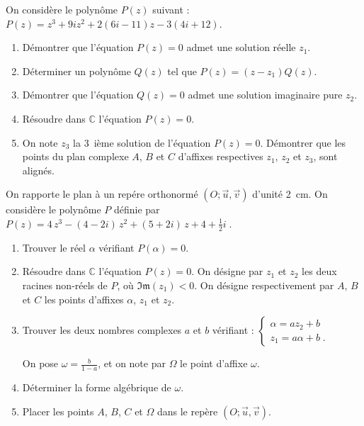 %
\begin{exo}
      On consid\`ere le polyn\^ome $P(z)$ suivant : $P(z) = z^3 + 9 i z^2 + 2(6i - 11)z - 3(4i + 12)$.
      \begin{enumerate}
            \item D\'emontrer que l'\'equation $P ( z ) = 0$ admet une solution r\'eelle $z_1$.
            \item D\'eterminer un polyn\^ome $Q ( z )$ tel que $P ( z ) = ( z - z_1 ) Q ( z )$.
            \item D\'emontrer que l'\'equation $Q ( z ) = 0$ admet une solution imaginaire pure $z_2$.
            \item R\'esoudre dans $\mathbb{C}$ l'\'equation $P ( z ) = 0$.
            \item On note $z_3$ la 3~i\`eme solution de l'\'equation $P ( z ) = 0$. 
                  D\'emontrer que les points du plan complexe $A$, $B$ et $C$ d'affixes respectives $z_1$, $z_2$ et $z_3$, 
                  sont align\'es.
      \end{enumerate}
\end{exo}
\begin{exo}
      On rapporte le plan \`a un rep\'ere orthonorm\'e $(O ; \vec{u} , \vec{v})$ d'unit\'e 2~cm.
      On consid\`ere le polyn\^ome $P$ d\'efinie par 
            $
                  P(z) = 4 \, z^{3} - \left(4 - 2 i\right) \, z^{2} + \left(5 + 2 i\right) \, z + 4 + \frac{1}{2} i \;.
            $
      \begin{enumerate}
            \item Trouver le r\'eel $\alpha$ v\'erifiant $P(\alpha) = 0$.
            \item R\'esoudre dans $\mathbb{C}$ l'\'equation $P(z) = 0$. \newline
                  On d\'esigne par $z_1$ et $z_2$ les deux racines non-r\'eels de $P$, o\`u $\mathfrak{Im}(z_1) < 0$.
                  On d\'esigne respectivement par $A$, $B$ et $C$ les points d'affixes $\alpha$, $z_1$ et $z_2$.
            \item Trouver les deux nombres complexes $a$ et $b$ v\'erifiant :
                  $
                        \left\lbrace
                              \begin{array}{l}
                                    \alpha = a z_2    + b \\
                                    z_1    = a \alpha + b \;.
                              \end{array}
                        \right.
                  $
                  
                  On pose $\omega = \frac{b}{1-a}$, et on note par $\Omega$ le point d'affixe $\omega$.
            \item D\'eterminer la forme alg\'ebrique de $\omega$.
            \item Placer les points $A$, $B$, $C$ et $\Omega$ dans le rep\`ere $(O ; \vec{u} , \vec{v})$.
      \end{enumerate}
\end{exo}
